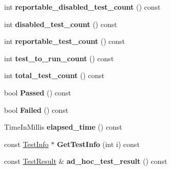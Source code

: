 \begin{DoxyCompactItemize}
int {\bfseries reportable\+\_\+disabled\+\_\+test\+\_\+count} () const
\item 
\mbox{\label{classtesting_1_1_test_case_a8ef690ab8ec74d02c99416637de71ae8}} 
int {\bfseries disabled\+\_\+test\+\_\+count} () const
\item 
\mbox{\label{classtesting_1_1_test_case_ae4e69f1a77b6aba274981e987e50acab}} 
int {\bfseries reportable\+\_\+test\+\_\+count} () const
\item 
\mbox{\label{classtesting_1_1_test_case_a57f115315eb756e23be6651bb5e6c638}} 
int {\bfseries test\+\_\+to\+\_\+run\+\_\+count} () const
\item 
\mbox{\label{classtesting_1_1_test_case_aba3cab19aaf7295284f0832f2cf895a3}} 
int {\bfseries total\+\_\+test\+\_\+count} () const
\item 
\mbox{\label{classtesting_1_1_test_case_a29bbfd227b732a90198b5280c039c271}} 
bool {\bfseries Passed} () const
\item 
\mbox{\label{classtesting_1_1_test_case_ae71c30eab6f1673b82090a0e745c2aa5}} 
bool {\bfseries Failed} () const
\item 
\mbox{\label{classtesting_1_1_test_case_acd7d6a77bce06da6ef90f5dad1c4def1}} 
Time\+In\+Millis {\bfseries elapsed\+\_\+time} () const
\item 
\mbox{\label{classtesting_1_1_test_case_a441e0eca232643671dc365c2924c255c}} 
const \mbox{\hyperlink{classtesting_1_1_test_info}{Test\+Info}} $\ast$ {\bfseries Get\+Test\+Info} (int i) const
\item 
\mbox{\label{classtesting_1_1_test_case_a6d5fc5003bc3352f3ddae7dadc6d2364}} 
const \mbox{\hyperlink{classtesting_1_1_test_result}{Test\+Result}} \& {\bfseries ad\+\_\+hoc\+\_\+test\+\_\+result} () const
\end{DoxyCompactItemize}
